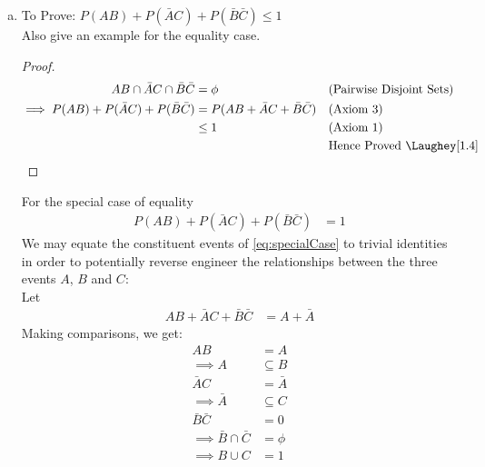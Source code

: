 \begin{enumerate}[a.]
\begin{proof}
\begin{align}
					&= P(A) + P(B) - P(AB) + P(\bar{A}\bar{B}) \nonumber\\
					&= P(A) - P(AB) + P(\bar{A}\bar{B}) + P(B)&& \text{(Rearranging the equation)}\nonumber\\
					&= P(A\bar{B}) + P(\bar{A}\bar{B}) + P(B) &&\text{(Using \cref{eq:totalProbLaw})} \nonumber\\
					&= P(\bar{B}) + P(B) &&\text{(Using \cref{eq:totalProbLawB})} \nonumber\\
					&= 1 &&\text{Hence Proved \Laughey[1.4]}\nonumber
				\end{align}
			\end{proof}	
	\item To Prove: $P(AB) + P(\bar A C) + P(\bar B \bar C) \leq 1$ \\
	Also give an example for the equality case.
	\!
		\begin{proof}
			\begin{align}
				AB \cap \bar{A}C \cap \bar{B}\bar{C} &= \phi && \text{(Pairwise Disjoint Sets)} \nonumber\\
				\implies P(AB) + P(\bar{A}C) + P(\bar{B}\bar{C}) &= P( AB + \bar{A}C + \bar{B}\bar{C} ) && \text{(Axiom 3)} \nonumber\\
				&\leq 1 && \text{(Axiom 1)} \nonumber\\
				&{} && \text{Hence Proved \Laughey[1.4]} \nonumber				
			\end{align}
		\end{proof}
	
		For the special case of equality\\
		\begin{align}
			P(AB) + P(\bar{A}C) + P(\bar{B}\bar{C}) &= 1 \label{eq:specialCase}
		\end{align}
		We may equate the constituent events of \cref{eq:specialCase} to trivial identities in order to potentially reverse engineer the relationships between the three events $A$, $B$ and $C$:\\[5pt]
		Let\\[-20pt]
		\begin{align}
			AB + \bar{A}C + \bar{B}\bar{C} &= A + \bar{A}
		\end{align}
		Making comparisons, we get:
		\begin{align}
			AB &= A \nonumber\\
			\implies A &\subseteq B \label{eq:tmp1}\\
			\bar{A}C &= \bar{A} \nonumber\\
			\implies \bar{A} &\subseteq C \label{eq:tmp2}\\
			\bar{B}\bar{C} &= 0 \nonumber\\
			\implies \bar{B} \cap \bar{C} &= \phi \nonumber\\
			\implies B \cup C &= 1 \label{eq:tmp3}
		\end{align}
		

\end{enumerate}
